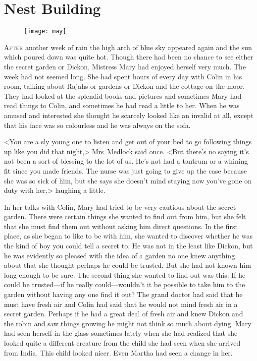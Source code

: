 \chapter{Nest Building} 
	
\begin{figure}[t!]
\centering
\texttt{[image: may]}
\end{figure}

	\lettrine[]{A}{fter} another week of rain the high arch of blue sky appeared again and the sun which poured down was quite hot. Though there had been no chance to see either the secret garden or Dickon, Mistress Mary had enjoyed herself very much. The week had not seemed long. She had spent hours of every day with Colin in his room, talking about Rajahs or gardens or Dickon and the cottage on the moor. They had looked at the splendid books and pictures and sometimes Mary had read things to Colin, and sometimes he had read a little to her. When he was amused and interested she thought he scarcely looked like an invalid at all, except that his face was so colourless and he was always on the sofa.

<You are a sly young one to listen and get out of your bed to go following things up like you did that night,> Mrs~Medlock said once. <But there's no saying it's not been a sort of blessing to the lot of us. He's not had a tantrum or a whining fit since you made friends. The nurse was just going to give up the case because she was so sick of him, but she says she doesn't mind staying now you've gone on duty with her,> laughing a little.

In her talks with Colin, Mary had tried to be very cautious about the secret garden. There were certain things she wanted to find out from him, but she felt that she must find them out without asking him direct questions. In the first place, as she began to like to be with him, she wanted to discover whether he was the kind of boy you could tell a secret to. He was not in the least like Dickon, but he was evidently so pleased with the idea of a garden no one knew anything about that she thought perhaps he could be trusted. But she had not known him long enough to be sure. The second thing she wanted to find out was this: If he could be trusted—if he really could—wouldn't it be possible to take him to the garden without having any one find it out? The grand doctor had said that he must have fresh air and Colin had said that he would not mind fresh air in a secret garden. Perhaps if he had a great deal of fresh air and knew Dickon and the robin and saw things growing he might not think so much about dying. Mary had seen herself in the glass sometimes lately when she had realized that she looked quite a different creature from the child she had seen when she arrived from India. This child looked nicer. Even Martha had seen a change in her.

